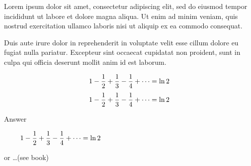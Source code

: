 Lorem ipsum dolor sit amet, consectetur adipiscing elit, sed do eiusmod tempor
incididunt ut labore et dolore magna aliqua. Ut enim ad minim veniam, quis
nostrud exercitation ullamco laboris nisi ut aliquip ex ea commodo consequat.


Duis aute irure dolor in reprehenderit in voluptate velit esse cillum dolore eu
fugiat nulla pariatur. Excepteur sint occaecat cupidatat non proident, sunt in
culpa qui officia deserunt mollit anim id est laborum.

$$
1 - {1 \over 2} + {1 \over 3} - {1 \over 4} + \cdots = \ln 2\hfil
$$
$$
1 - {1 \over 2} + {1 \over 3} - {1 \over 4} + \cdots = \ln 2\hfill
$$

Answer

$$\leftline{\indent$\displaystyle
1-{1\over2}+{1\over3}-{1\over4}+\cdots=\ln2$}$$

or \dots (see book)
\bye

